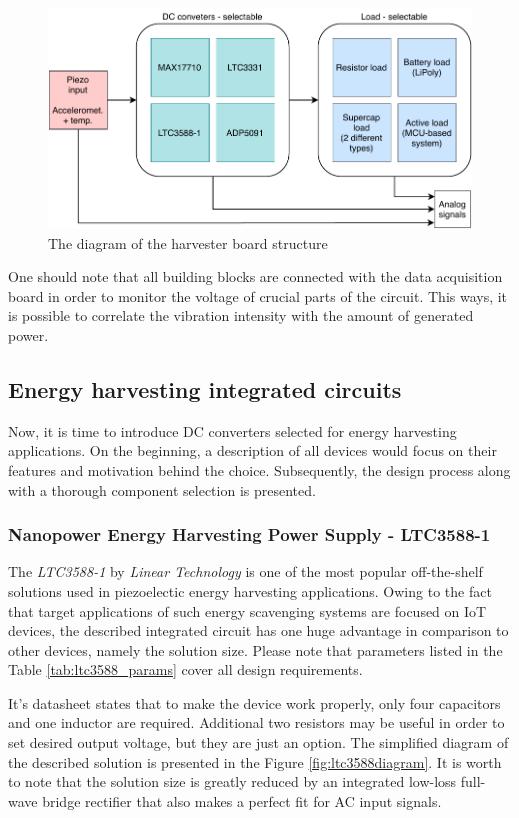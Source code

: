 \documentclass[12pt,a4paper]{article}
\begin{document}
\begin{figure}[ht!]
\includegraphics[scale=0.9]{harvesterdiagram.pdf}
\caption{The diagram of the harvester board structure}
\label{fig:harvesterdiagram}
\end{figure}

One should note that all building blocks are connected with the data acquisition board in order to monitor the voltage of crucial parts of the circuit. This ways, it is possible to correlate the vibration intensity with the amount of generated power.


\subsection{Energy harvesting integrated circuits}

Now, it is time to introduce DC converters selected for energy harvesting applications. On the beginning, a description of all devices would focus on their features and motivation behind the choice. Subsequently, the design process along with a thorough component selection is presented.

\subsubsection{Nanopower Energy Harvesting Power Supply - LTC3588-1}
The \textit{LTC3588-1} by \textit{Linear Technology} is one of the most popular off-the-shelf solutions used in piezoelectic energy harvesting applications. Owing to the fact that target applications of such energy scavenging systems are focused on IoT devices, the described integrated circuit has one huge advantage in comparison to other devices, namely the solution size. Please note that parameters listed in the Table \ref{tab:ltc3588_params} cover all design requirements.
\par
It's datasheet \cite{ltc3588_params} states that to make the device work properly, only four capacitors and one inductor are required. Additional two resistors may be useful in order to set desired output voltage, but they are just an option. The simplified diagram of the described solution is presented in the Figure \ref{fig:ltc3588diagram}. It is worth to note that the solution size is greatly reduced by an integrated low-loss full-wave bridge rectifier that also makes a perfect fit for AC input signals.
\end{document}
